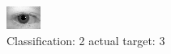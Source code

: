 \begin{figure}[h!]
\begin{center}
\includegraphics[width=0.60\columnwidth]{figures/ID539_class_2_target_3.png}
\end{center}
\caption{ Classification: 2 actual target: 3}
\label{fig:ID539_class_2_target_3}
\end{figure}
